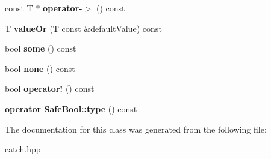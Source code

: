 \begin{DoxyCompactItemize}
\mbox{\label{classCatch_1_1Option_ae8343cbc36dbb95b2dce333d2a6fdc28}} 
const T $\ast$ {\bfseries operator-\/$>$} () const
\item 
\mbox{\label{classCatch_1_1Option_a8d9ae2e30b0eb76fe134a6fbc8423124}} 
T {\bfseries value\+Or} (T const \&default\+Value) const
\item 
\mbox{\label{classCatch_1_1Option_a97c95829afbe92f2bcc5fd75b32c0825}} 
bool {\bfseries some} () const
\item 
\mbox{\label{classCatch_1_1Option_a821753afdc3fac947a13a01fbe0d248e}} 
bool {\bfseries none} () const
\item 
\mbox{\label{classCatch_1_1Option_a96dccb86bdf45ee0c08e122b6133bef3}} 
bool {\bfseries operator!} () const
\item 
\mbox{\label{classCatch_1_1Option_a8ed8de7b072f893c85df14913dbbe197}} 
{\bfseries operator Safe\+Bool\+::type} () const
\end{DoxyCompactItemize}


The documentation for this class was generated from the following file\+:\begin{DoxyCompactItemize}
\item 
catch.\+hpp\end{DoxyCompactItemize}
